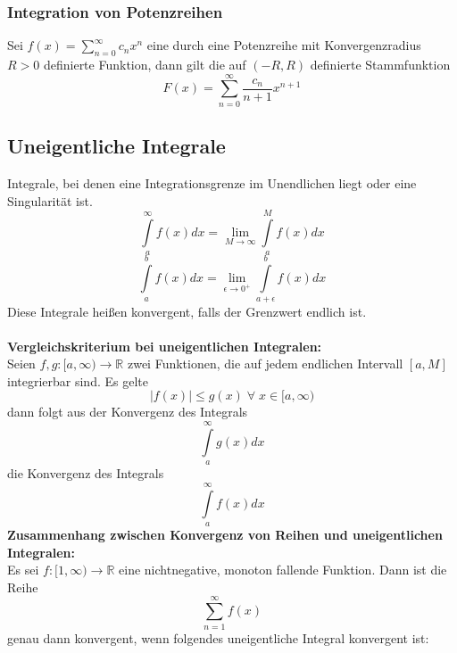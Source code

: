 \documentclass[a4paper,twocolumn,10pt]{article}
\begin{document}
\subsubsection{Integration von Potenzreihen}
Sei $f(x)=\sum\limits_{n=0}^{\infty}c_nx^n$ eine durch eine Potenzreihe mit Konvergenzradius $R>0$ definierte Funktion, dann gilt die auf $(-R,R)$ definierte Stammfunktion
\begin{equation*}
F(x)=\sum\limits_{n=0}^{\infty}\frac{c_n}{n+1}x^{n+1}
\end{equation*}

\subsection{Uneigentliche Integrale}
Integrale, bei denen eine Integrationsgrenze im Unendlichen liegt oder eine Singularität ist.
\begin{equation*}
\int\limits_{a}^{\infty}f(x)dx=\lim\limits_{M\rightarrow\infty}\int\limits_{a}^{M}f(x)dx
\end{equation*}
\begin{equation*}
\int\limits_{a}^{b}f(x)dx=\lim\limits_{\epsilon\rightarrow 0^+}\int\limits_{a+\epsilon}^{b}f(x)dx
\end{equation*}
Diese Integrale heißen konvergent, falls der Grenzwert endlich ist.\\\\
\textbf{Vergleichskriterium bei uneigentlichen Integralen:}\\
Seien $f,g: [a,\infty) \rightarrow \mathbb{R}$ zwei Funktionen, die auf jedem endlichen Intervall $[a,M]$ integrierbar sind. Es gelte
\begin{equation*}
|f(x)|\leq g(x)\;\forall\;x\in [a,\infty)
\end{equation*}
dann folgt aus der Konvergenz des Integrals
\begin{equation*}
\int\limits_{a}^{\infty}g(x)dx
\end{equation*}
die Konvergenz des Integrals
\begin{equation*}
\int\limits_{a}^{\infty}f(x)dx
\end{equation*}
\textbf{Zusammenhang zwischen Konvergenz von Reihen und uneigentlichen Integralen:}\\
Es sei $f:[1,\infty) \rightarrow\mathbb{R}$ eine nichtnegative, monoton fallende Funktion. Dann ist die Reihe
\begin{equation*}
\sum\limits_{n=1}^{\infty}f(x)
\end{equation*}
genau dann konvergent, wenn folgendes uneigentliche Integral konvergent ist:
\end{document}

